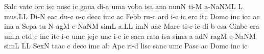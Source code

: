 \spatium
\sgn Sal\punctum c\egn
\sgn vat\punctum c\egn
\sgn {}or\punctum c\egn
\sgn {}is\punctum c\egn
\spatium
\sgn nos\punctum c\egn
{}i{}\punctum c\egn
\spatium
\sgn gau\punctum a\egn
\sgn di-\punctum a\egn
\sgn {}um\punctum a\egn
\spatium
\sgn vob\punctum a\egn
\sgn {}is\punctum a\egn
\spatium
\sgn {}an\punctum a\egn
\sgn nun\punctum N\egn
\sgn ti-\punctum M\egn
\sgn {}a-\pessubbipunctis NaNM\nonspatium\punctuminclinatum L\egn
\custos L
\lineaproxima
\sgn mu{s.}\punctum L\augmentum L\egn
\spatium
\divisiofinalis
\spatium
\sgn Di-\punctum N\egn
\sgn {}e{}\pes ac\egn
\spatium
\sgn du-\punctum c\egn
\sgn {}o-\punctum c\egn
\sgn dec\punctum c\egn
\sgn {}im\punctum c\egn
\sgn {}a{}\punctum c\egn
\spatium
\sgn Feb\punctum b\egn
\sgn ru-\punctum c\egn
\sgn {}ar\punctum d\egn
\sgn {}i-\punctum c\egn
\sgn {}i{}\punctum c\egn
\spatium
\sgn {}er\punctum c\egn
\sgn {}it\punctum c\egn
\spatium
\sgn Dom\punctum c\egn
\sgn {}in\punctum c\egn
\sgn {}ic\punctum c\egn
\sgn {}a{}\punctum c\egn
\spatium
\sgn {}in\punctum a\egn
\spatium
\custos a
\lineaproxima
\sgn Sep\punctum a\egn
\sgn tu-\punctum N\egn
\sgn {}ag\punctum M\egn
\sgn {}e-\pessubbipunctis NaNM\egn
\sgn sim\punctum L\egn
\sgn {}a.\punctum L\augmentum L\egn
\spatium
\divisiofinalis
\spatium
{}im\punctum N\egn
\sgn {}a{}\pes ac\egn
\spatium
\sgn Mar\punctum c\egn
\sgn ti-\punctum c\egn
\sgn {}i{}\punctum c\egn
\spatium
\sgn di-\punctum b\egn
\sgn {}es\punctum a\egn
\spatium
\sgn Cin\pes bc\egn
\sgn {}er\punctum a\egn
\sgn {}u{m,}\punctum a\egn
\spatium
\divisiominima
\spatium
\sgn { }et\punctum d\egn
\spatium
\custos c
\lineaproxima
\sgn {}in\punctum c\egn
\sgn {}it\punctum c\egn
\sgn {}i-\punctum c\egn
\sgn {}um\punctum c\egn
\spatium
\sgn jej\punctum c\egn
\sgn {}un\punctum c\egn
\sgn {}i-\punctum c\egn
\sgn {}i{}\punctum c\egn
\spatium
\sgn sac\punctum a\egn
\sgn rat\punctum a\egn
\sgn {}is\punctum a\egn
\sgn sim\punctum a\egn
\sgn {}{\ae}{}\punctum a\egn
\spatium
{}ad\punctum N\egn
\sgn rag\punctum M\egn
\sgn {}e-\pessubbipunctis NaNM\egn
\sgn sim\punctum L\egn
\sgn {}{\ae}{}\punctum L\augmentum L\egn
\spatium
\divisiofinalis
\spatium
\sgn Sex\punctum N\egn
\sgn ta{}\pes ac\egn
\spatium
\custos c
\lineaproxima
\sgn dec\punctum c\egn
\sgn {}im\punctum c\egn
\sgn {}a{}\punctum b\egn
\spatium
\sgn {}Ap\punctum c\egn
\sgn ri-\punctum d\egn
\sgn lis\punctum c\egn
\spatium
\sgn san\punctum c\egn
{}um\punctum c\egn
\spatium
\sgn Pas\punctum c\egn
{}a{}\punctum c\egn
\spatium
\sgn Dom\punctum c\egn
\sgn {}in\punctum c\egn
\sgn {}i{}\punctum c\egn
